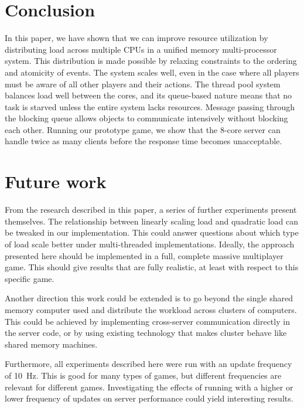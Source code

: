 \section{Conclusion}
\label{sec:conclusion} 
In this paper, we have shown that we can improve resource utilization
by distributing load across multiple CPUs in a unified memory
multi-processor system. This distribution is made possible by relaxing
constraints to the ordering and atomicity of events. The system scales
well, even in the case where all players must be aware of all other
players and their actions. The thread pool system balances load well
between the cores, and its queue-based nature means that no task is
starved unless the entire system lacks resources. Message passing
through the blocking queue allows objects to communicate intensively
without blocking each other. Running our prototype game, we show that
the 8-core server can handle twice as many clients before the
response time becomes unacceptable.

\section{Future work}\label{sec:fw}
From the research described in this paper, a series of further
experiments present themselves.
%
The relationship between linearly scaling load and quadratic load can
be tweaked in our implementation. This could answer questions about
which type of load scale better under multi-threaded
implementations. Ideally, the approach presented here should be
implemented in a full, complete massive multiplayer game. This should
give results that are fully realistic, at least with respect to this
specific game.

Another direction this work could be extended is to go beyond the
single shared memory computer used and distribute the workload
across clusters of computers. This could be achieved by implementing
cross-server communication directly in the server code, or by using
existing technology that makes cluster behave like shared memory
machines. 

Furthermore, all experiments described here were run with an update
frequency of 10~Hz. This is good for many types of games, but
different frequencies are relevant for different games. Investigating
the effects of running with a higher or lower frequency of updates on
server performance could yield interesting results.

